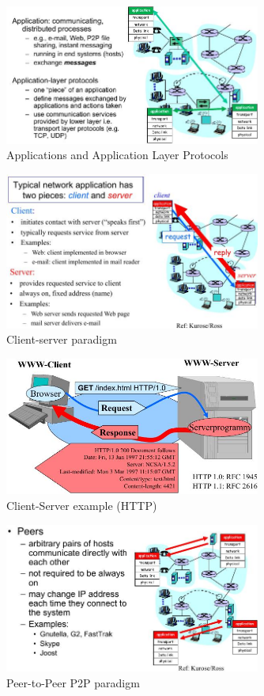 \documentclass[ngerman,a4paper,12pt]{scrreprt}
\begin{document}
\begin{figure}[H]
	\centering
	\includegraphics[width=0.75\textwidth]{img/V13.2.jpg}
	\caption{Applications and Application Layer Protocols}
	\label{}
\end{figure}

\begin{figure}[H]
	\centering
	\includegraphics[width=0.75\textwidth]{img/V13.3.jpg}
	\caption{Client-server paradigm}
	\label{}
\end{figure}

\begin{figure}[H]
	\centering
	\includegraphics[width=0.75\textwidth]{img/V13.4.jpg}
	\caption{Client-Server example (HTTP)}
	\label{}
\end{figure}

\begin{figure}[H]
	\centering
	\includegraphics[width=0.75\textwidth]{img/V13.5.jpg}
	\caption{Peer-to-Peer P2P paradigm}
	\label{}
\end{figure}
\end{document}
